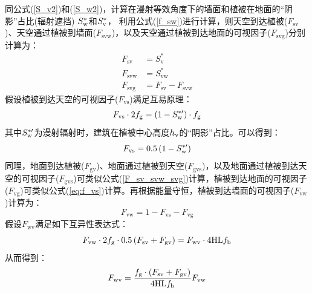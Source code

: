 同公式(\ref{S_v2})和(\ref{S_w2})，计算在漫射等效角度下的墙面和植被在地面的“阴影”占比(辐射遮挡) $S_{\rm w}^\ast$和$S_{\rm v}^\ast$，
利用公式(\ref{f_sw})进行计算，则天空到达植被($F_{\mathrm{sv}}$)、天空通过植被到墙面($F_{\mathrm{svw}}$)，以及天空通过植被到达地面的可视因子($F_{\mathrm{svg}}$)分别计算为：
\begin{equation}\label{F_sv_svw_svg}
  \begin{aligned}F_{\mathrm{s v}} &=S_{\mathrm{v}}^{*} \\ F_{\mathrm{s v w}} &=S_{\mathrm{v w}}^{*} \\ F_{\mathrm{s v g}} &=F_{\mathrm{s v}}-F_{\mathrm{s v w}}\end{aligned}
\end{equation}
假设植被到达天空的可视因子($F_{\mathrm{vs}}$)满足互易原理：
\begin{equation}
  F_{\mathrm{vs}}\cdot 2f_{\rm g} = \left( 1-S_{\rm w} ^{*\prime} \right ) \cdot f_{\rm g}
\end{equation}
其中$S_{\rm w} ^{*\prime}$为漫射辐射时，建筑在植被中心高度$h_{\rm v}$的“阴影”占比。可以得到：
\begin{equation}\label{eq:f_vs}
  F_{\mathrm{vs}} = 0.5 \left( 1-S_{\rm w} ^{*\prime} \right )
\end{equation}
同理，地面到达植被($F_{\mathrm{gv}}$)、地面通过植被到天空($F_{\mathrm{gvs}}$)，以及地面通过植被到达天空的可视因子($F_{\mathrm{gvs}}$)可类似公式(\ref{F_sv_svw_svg})计算，植被到达地面的可视因子($F_{\mathrm{vg}}$)可类似公式(\ref{eq:f_vs})计算。再根据能量守恒，植被到达墙面的可视因子($F_{\mathrm{vw}}$)计算为：
\begin{equation}
  F_{\mathrm{v w}}=1-F_{\mathrm{v s}}-F_{\mathrm{v g}}
\end{equation}
假设$F_{\mathrm{wv}}$满足如下互异性表达式：
\begin{equation}
  F_{\mathrm{vw}}\cdot 2f_{\rm g} \cdot 0.5\left( F_{\mathrm{sv}}+F_{\mathrm{gv}} \right ) = F_{\mathrm{wv}} \cdot 4 {\rm HL} f_{\rm b}
\end{equation}
从而得到：
\begin{equation}
  F_{\mathrm{wv}}=\frac{f_{\rm g} \cdot \left( F_{\mathrm{sv}}+F_{\mathrm{gv}} \right )} {4 {\rm HL}f_{\rm b}} F_{\mathrm{vw}}
\end{equation}
